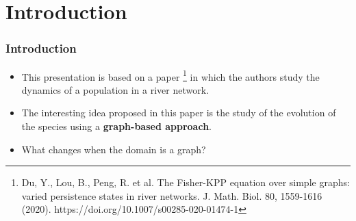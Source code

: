 \section{Introduction}


\begin{frame}
    \frametitle{Introduction}
    \begin{itemize}
        \item This presentation is based on a paper \footnote{Du, Y., Lou, B., Peng, R. et al. The Fisher-KPP equation over simple graphs: varied persistence states in river networks. J. Math. Biol. 80, 1559-1616 (2020). https://doi.org/10.1007/s00285-020-01474-1} in which the authors study the dynamics of a population in a river network.
        \item The interesting idea proposed in this paper is the study of the evolution of the species using a \textbf{graph-based approach}. 
        \item What changes when the domain is a graph?
    \end{itemize}
\end{frame}



